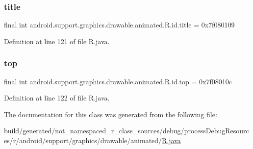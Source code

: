 \subsubsection{\texorpdfstring{title}{title}}
{\footnotesize\ttfamily final int android.\+support.\+graphics.\+drawable.\+animated.\+R.\+id.\+title = 0x7f080109\hspace{0.3cm}{\ttfamily [static]}}



Definition at line 121 of file R.\+java.

\mbox{\label{classandroid_1_1support_1_1graphics_1_1drawable_1_1animated_1_1_r_1_1id_a9ba6768ae53717c0d6be15c41b3d19ae}} 
\subsubsection{\texorpdfstring{top}{top}}
{\footnotesize\ttfamily final int android.\+support.\+graphics.\+drawable.\+animated.\+R.\+id.\+top = 0x7f08010c\hspace{0.3cm}{\ttfamily [static]}}



Definition at line 122 of file R.\+java.



The documentation for this class was generated from the following file\+:\begin{DoxyCompactItemize}
\item 
build/generated/not\+\_\+namespaced\+\_\+r\+\_\+class\+\_\+sources/debug/process\+Debug\+Resources/r/android/support/graphics/drawable/animated/\mbox{\hyperlink{android_2support_2graphics_2drawable_2animated_2_r_8java}{R.\+java}}\end{DoxyCompactItemize}
